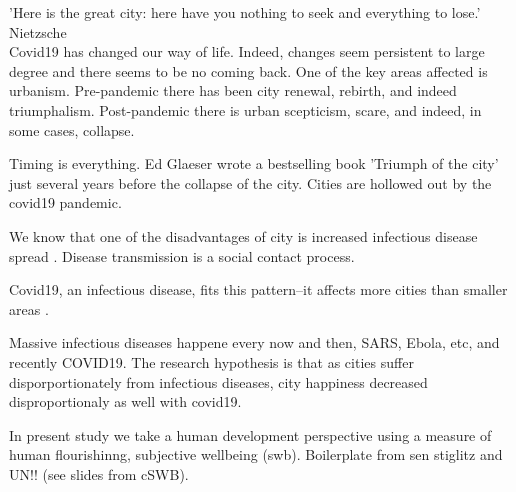 \documentclass[10pt, letterpaper]{article}
\begin{document}
\begin{spacing}{1.4}

'Here is the great city: here have you nothing to seek and everything to lose.' Nietzsche\\


Covid19 has changed our way of life. Indeed, changes seem persistent
  to large degree and there seems to be no coming back. One of the key areas
  affected is urbanism. Pre-pandemic there has been city renewal, rebirth, and indeed
  triumphalism. Post-pandemic there is urban scepticism, scare, and indeed, in
  some cases, collapse.


Timing is everything. Ed Glaeser wrote a bestselling book 'Triumph of the city'
just several years before the collapse of the city. Cities are hollowed out by
the covid19 pandemic.


We know that one of the disadvantages of city is increased infectious disease
spread%
\citep{bettencourt10,bettencourt10b,bettencourt07}. %
Disease transmission is a social contact
process. %


Covid19, an infectious disease, fits this pattern--it affects more cities than
smaller areas  \citep{stier2021early}. 

Massive infectious diseases happene every now and then, SARS, Ebola, etc, and recently COVID19. The
research hypothesis is that as cities suffer disporportionately from infectious
diseases, city happiness decreased disproportionaly as well with covid19.



  In present study we take a human development perspective using a measure of
  human flourishinng, subjective wellbeing (swb).
  Boilerplate from sen stiglitz and UN!! (see slides from cSWB).


\end{spacing}
\end{document}
